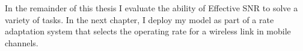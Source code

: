 In the remainder of this thesis I evaluate the ability of Effective SNR to solve a variety of tasks. In the next chapter, I deploy my model as part of a rate adaptation system that selects the operating rate for a wireless link in mobile channels.


\ifx\mainfile\undefined

\fi

